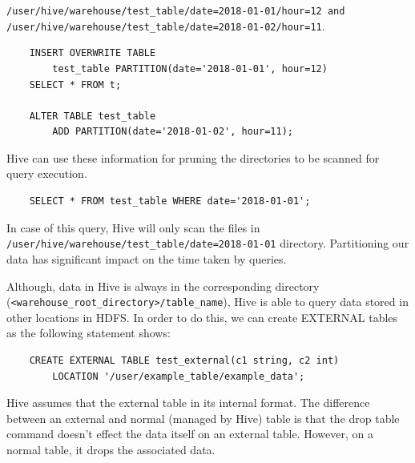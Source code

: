 \texttt{/user/hive/warehouse/test\_table/date=2018-01-01/hour=12 and /user/hive/warehouse/test\_table/date=2018-01-02/hour=11}.

\begin{lstlisting}
	INSERT OVERWRITE TABLE
		test_table PARTITION(date='2018-01-01', hour=12)
	SELECT * FROM t;
	
	ALTER TABLE test_table
		ADD PARTITION(date='2018-01-02', hour=11);
\end{lstlisting}

Hive can use these information for pruning the directories to be scanned for query execution. 
\begin{lstlisting}
	SELECT * FROM test_table WHERE date='2018-01-01';
\end{lstlisting}
In case of this query, Hive will only scan the files in \texttt{/user/hive/warehouse/test\_table/date=2018-01-01} directory. Partitioning our data has significant impact on the time taken by queries.

Although, data in Hive is always in the corresponding directory (\texttt{<warehouse\_root\_directory>/table\_name}), Hive is able to query data stored in other locations in HDFS. In order to do this, we can create EXTERNAL tables as the following statement shows:
\begin{lstlisting}
	CREATE EXTERNAL TABLE test_external(c1 string, c2 int)
		LOCATION '/user/example_table/example_data';
\end{lstlisting}

Hive assumes that the external table in its internal format. The difference between an external and normal (managed by Hive) table is that the drop table command doesn't effect the data itself on an external table. However, on a normal table, it drops the associated data.

